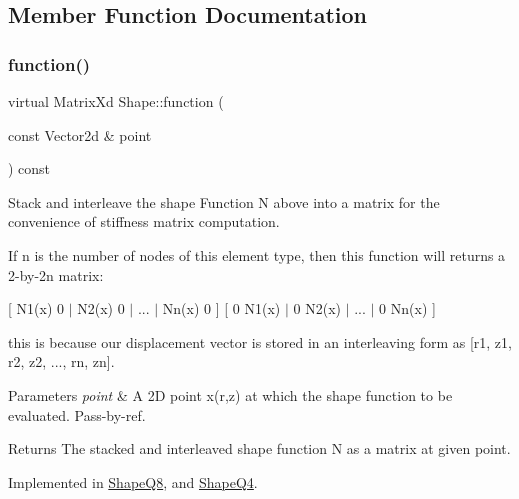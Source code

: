 \subsection{Member Function Documentation}
\mbox{\label{class_shape_ab6e0d64b40e09c176ce2ece24bc94a37}} 
\subsubsection{\texorpdfstring{function()}{function()}}
{\footnotesize\ttfamily virtual Matrix\+Xd Shape\+::function (\begin{DoxyParamCaption}\item[{const Vector2d \&}]{point }\end{DoxyParamCaption}) const\hspace{0.3cm}{\ttfamily [pure virtual]}}



Stack and interleave the shape Function N above into a matrix for the convenience of stiffness matrix computation. 

If n is the number of nodes of this element type, then this function will returns a 2-\/by-\/2n matrix\+:

\mbox{[} N1(x) 0 $\vert$ N2(x) 0 $\vert$ ... $\vert$ Nn(x) 0 \mbox{]} \mbox{[} 0 N1(x) $\vert$ 0 N2(x) $\vert$ ... $\vert$ 0 Nn(x) \mbox{]}

this is because our displacement vector is stored in an interleaving form as \mbox{[}r1, z1, r2, z2, ..., rn, zn\mbox{]}.


\begin{DoxyParams}{Parameters}
{\em point} & A 2D point x(r,z) at which the shape function to be evaluated. Pass-\/by-\/ref. \\
\hline
\end{DoxyParams}
\begin{DoxyReturn}{Returns}
The stacked and interleaved shape function N as a matrix at given point. 
\end{DoxyReturn}


Implemented in \mbox{\hyperlink{class_shape_q8_a7e859a85ee52c8d3ab3051326fc09ab0}{Shape\+Q8}}, and \mbox{\hyperlink{class_shape_q4_a306cacfd4d87384b3d06c2788cafd4ba}{Shape\+Q4}}.

\mbox{\label{class_shape_a0e0400bca54c29b5097c84ace51ecc7b}} 
